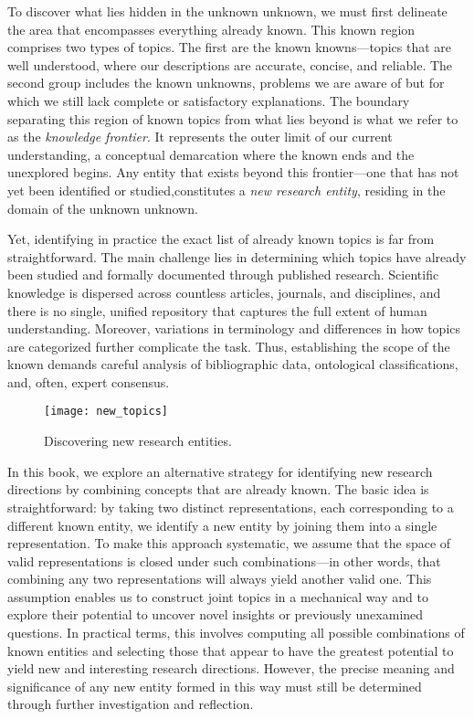 To discover what lies hidden in the unknown unknown, we must first delineate the area that encompasses everything already known. This known region comprises two types of topics. The first are the known knowns—topics that are well understood, where our descriptions are accurate, concise, and reliable. The second group includes the known unknowns, problems we are aware of but for which we still lack complete or satisfactory explanations. The boundary separating this region of known topics from what lies beyond is what we refer to as the \emph{knowledge frontier}. It represents the outer limit of our current understanding, a conceptual demarcation where the known ends and the unexplored begins. Any entity that exists beyond this frontier—one that has not yet been identified or studied,constitutes a \emph{new research entity}, residing in the domain of the unknown unknown.

Yet, identifying in practice the exact list of already known topics is far from straightforward. The main challenge lies in determining which topics have already been studied and formally documented through published research. Scientific knowledge is dispersed across countless articles, journals, and disciplines, and there is no single, unified repository that captures the full extent of human understanding. Moreover, variations in terminology and differences in how topics are categorized further complicate the task. Thus, establishing the scope of the known demands careful analysis of bibliographic data, ontological classifications, and, often, expert consensus.

\begin{figure}[h]
\centering\texttt{[image: new\_topics]}
\caption{\label{fig:intro_new_topics}Discovering new research entities.}
\end{figure}

In this book, we explore an alternative strategy for identifying new research directions by combining concepts that are already known. The basic idea is straightforward: by taking two distinct representations, each corresponding to a different known entity, we identify a new entity by joining them into a single representation. To make this approach systematic, we assume that the space of valid representations is closed under such combinations—in other words, that combining any two representations will always yield another valid one. This assumption enables us to construct joint topics in a mechanical way and to explore their potential to uncover novel insights or previously unexamined questions. In practical terms, this involves computing all possible combinations of known entities and selecting those that appear to have the greatest potential to yield new and interesting research directions. However, the precise meaning and significance of any new entity formed in this way must still be determined through further investigation and reflection.

